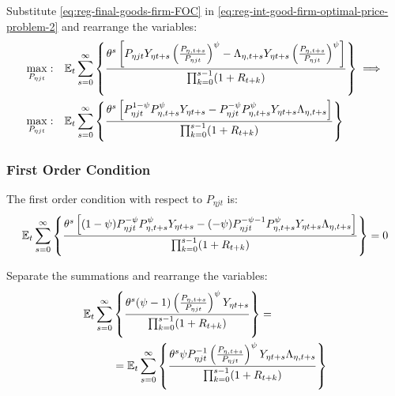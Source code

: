 \documentclass[../thesis.tex]{subfiles}
\begin{document}
Substitute \ref{eq:reg-final-goods-firm-FOC} in \ref{eq:reg-int-good-firm-optimal-price-problem-2} and rearrange the variables:
\begin{align}
	\max_{P_{\eta jt}}: & \quad {\mathbb{E}_{t}} \sum_{s=0}^{\infty} \left\{ \frac{\theta^s \left[ P_{\eta jt} Y_{\eta t+s} \left( \frac{P_{\eta, t+s}}{P_{\eta jt}} \right)^{\psi} - \Lambda_{\eta, t+s} Y_{\eta t+s} \left( \frac{P_{\eta, t+s}}{P_{\eta jt}} \right)^{\psi} \right]}{\prod_{k=0}^{s-1}(1+R_{t+k})} \right\} \implies \nonumber 
	\\
	\max_{P_{\eta jt}}: & \quad {\mathbb{E}_{t}} \sum_{s=0}^{\infty} \left\{ \frac{\theta^s \left[ P_{\eta jt}^{1-\psi} P_{\eta, t+s}^{\psi} Y_{\eta t+s} - P_{\eta jt}^{-\psi} P_{\eta, t+s}^{\psi} Y_{\eta t+s} \Lambda_{\eta, t+s} \right]}{\prod_{k=0}^{s-1}(1+R_{t+k})} \right\} \nonumber
\end{align}


\subsubsection*{First Order Condition}

The first order condition with respect to $P_{\eta jt}$ is:
\begin{align}
	& \quad {\mathbb{E}_{t}} \sum_{s=0}^{\infty} \left\{ \frac{\theta^s \left[ (1-\psi) P_{\eta jt}^{-\psi} P_{\eta, t+s}^{\psi} Y_{\eta t+s} - (-\psi) P_{\eta jt}^{-\psi-1} P_{\eta, t+s}^{\psi} Y_{\eta t+s} \Lambda_{\eta, t+s} \right]}{\prod_{k=0}^{s-1}(1+R_{t+k})} \right\} = 0 \nonumber
\end{align}


Separate the summations and rearrange the variables:
\begin{align}
	\begin{split}
		{\mathbb{E}_{t}} \sum_{s=0}^{\infty} &\left\{ \frac{\theta^s (\psi-1) \left( \frac{P_{\eta, t+s}} {P_{\eta jt}} \right)^{\psi} Y_{\eta t+s}} {\prod_{k=0}^{s-1} (1+R_{t+k})} \right\} = \\
		&= {\mathbb{E}_{t}} \sum_{s=0}^{\infty} \left\{ \frac{\theta^s \psi P_{\eta jt}^{-1} \left( \frac{P_{\eta, t+s}} {P_{\eta jt}} \right)^{\psi} Y_{\eta t+s} \Lambda_{\eta, t+s}}{\prod_{k=0}^{s-1}(1+R_{t+k})} \right\} \label{eq:reg-int-good-firm-optimal-price-FOC}
	\end{split}
\end{align}

\end{document}
